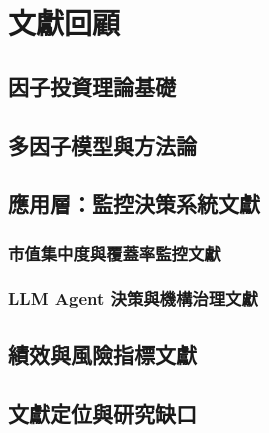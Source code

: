 \chapter{文獻回顧}\label{ch:literature}

\section{因子投資理論基礎}\label{sec:lit-factor}

\section{多因子模型與方法論}\label{sec:lit-method}

\section{應用層：監控決策系統文獻}\label{sec:lit-app}
\subsection{市值集中度與覆蓋率監控文獻}\label{sec:lit-conc}
\subsection{LLM Agent 決策與機構治理文獻}\label{sec:lit-llm}

\section{績效與風險指標文獻}\label{sec:lit-metrics}

\section{文獻定位與研究缺口}\label{sec:lit-gap}
